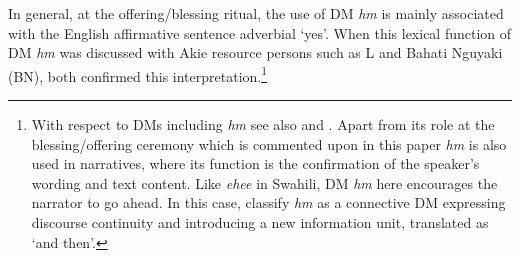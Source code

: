 \documentclass[output=paper,colorlinks,citecolor=brown]{langscibook}
\begin{document}
In general, at the offering/blessing ritual, the use of DM \textit{hm} is mainly associated  with the English affirmative sentence adverbial ‘yes’. When this lexical function of DM \textit{hm} was discussed with Akie resource persons such as L and Bahati Nguyaki (BN), both confirmed  this interpretation.\footnote{ With respect to DMs including \textit{hm} see also \citet{HeineEtAl2017} and \citet[137--146]{KonigEtAl2015}. Apart from its role at the blessing/offering ceremony which is commented upon in this paper \textit{hm} is also used in narratives, where its function is the confirmation of the speaker’s wording and text content. Like \textit{ehee} in Swahili, DM \textit{hm} here encourages the narrator to go ahead. In this case, \citet[152]{HeineEtAl2017}  classify \textit{hm} as a connective DM expressing discourse continuity and introducing a new information unit, translated as ‘and then’.}


\end{document}
